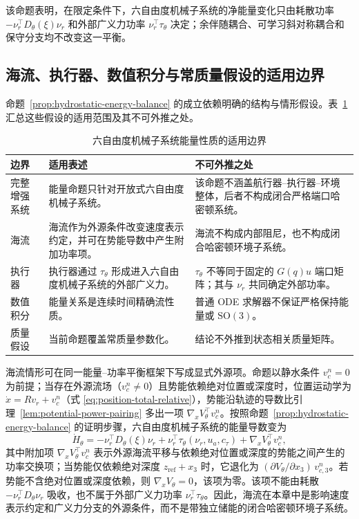 \documentclass[UTF8,zihao=-4]{ctexrep}
\newcommand{\SO}{\mathrm{SO}}
\begin{document}
该命题表明，在限定条件下，六自由度机械子系统的净能量变化只由耗散功率 \(-\nu_r^\top D_\theta(\xi)\nu_r\) 和外部广义力功率 \(\nu_r^\top\tau_\theta\) 决定；余伴随耦合、可学习斜对称耦合和保守分支均不改变这一平衡。

\subsection{海流、执行器、数值积分与常质量假设的适用边界}

命题~\ref{prop:hydrostatic-energy-balance} 的成立依赖明确的结构与情形假设。表~\ref{tab:energy-boundaries} 汇总这些假设的适用范围及其不可外推之处。

\begin{table}[htbp]
  \centering
  \caption{六自由度机械子系统能量性质的适用边界}
  \label{tab:energy-boundaries}
  \begin{tabularx}{\textwidth}{>{\raggedright\arraybackslash}p{}>{\raggedright\arraybackslash}p{}>{\raggedright\arraybackslash}X}
    \toprule
    边界 & 适用表述 & 不可外推之处 \\
    \midrule
    完整增强系统 & 能量命题只针对开放式六自由度机械子系统。 & 该命题不涵盖航行器--执行器--环境整体，后者不构成闭合严格端口哈密顿系统。 \\
    海流 & 海流作为外源条件改变速度表示约定，并可在势能导数中产生附加功率项。 & 海流不构成内部阻尼，也不构成闭合哈密顿环境子系统。 \\
    执行器 & 执行器通过 \(\tau_\theta\) 形成进入六自由度机械子系统的外部广义力。 & \(\tau_\theta\) 不等同于固定的 \(G(q)u\) 端口矩阵；其与 \(\nu_r\) 共同确定外部功率。 \\
    数值积分 & 能量关系是连续时间精确流性质。 & 普通 ODE 求解器不保证严格保持能量或 \(\SO(3)\)。 \\
    质量假设 & 当前命题覆盖常质量参数化。 & 结论不外推到状态相关质量矩阵。 \\
    \bottomrule
  \end{tabularx}
\end{table}

海流情形可在同一能量--功率平衡框架下写成显式外源项。命题以静水条件 \(v_c^n=0\) 为前提；当存在外源流场（\(v_c^n\neq0\)）且势能依赖绝对位置或深度时，位置运动学为 \(\dot x=Rv_r+v_c^n\)（式 \eqref{eq:position-total-relative}），势能沿轨迹的导数比引理~\ref{lem:potential-power-pairing} 多出一项 \(\nabla_x V_\theta^\top v_c^n\)。按照命题~\ref{prop:hydrostatic-energy-balance} 的证明步骤，六自由度机械子系统的能量导数变为
\begin{equation}
  \dot H_\theta
  =
  -\nu_r^\top D_\theta(\xi)\nu_r
  +\nu_r^\top\tau_\theta(\nu_r,u_a,c_\tau)
  +\nabla_x V_\theta^\top v_c^n ,
  \label{eq:energy-balance-current}
\end{equation}
其中附加项 \(\nabla_x V_\theta^\top v_c^n\) 表示外源海流平移与依赖绝对位置或深度的势能之间产生的功率交换项；当势能仅依赖绝对深度 \(z_{\mathrm{ref}}+x_3\) 时，它退化为 \((\partial V_\theta/\partial x_3)\,v_{c,3}^n\)。若势能不含绝对位置或深度依赖，则 \(\nabla_x V_\theta=0\)，该项为零。该项不能由耗散 \(-\nu_r^\top D_\theta\nu_r\) 吸收，也不属于外部广义力功率 \(\nu_r^\top\tau_\theta\)。因此，海流在本章中是影响速度表示约定和广义力分支的外源条件，而不是带独立储能的闭合哈密顿环境子系统。
\end{document}
